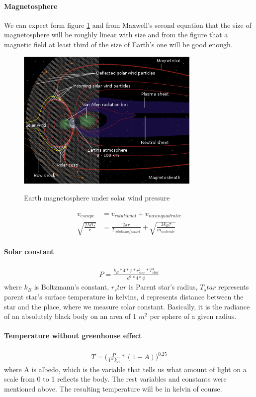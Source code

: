 \documentclass{cfp}
\begin{document}
\paragraph{Magnetosphere} We can expect form figure \ref{mag} and from Maxwell's second equation that the size of magnetosphere will be roughly linear with size and from the figure that a magnetic field at least third of the size of Earth's one will be good enough.
\begin{figure}[!h]
\centering
\caption{Earth magnetosphere under solar wind pressure}
\includegraphics[width=250pt]{mag.png}
\label{mag}
\end{figure}
\begin{align}
v_{escape} &= v_{rotational} + v_{mean quadratic}\\
\sqrt{\frac{2MG}{r}} &= \frac{2 \pi r}{T_{rotation of planet}} + \sqrt{\frac{3 k_B \tau}{m_{molecule}}}
\end{align}
\paragraph{Solar constant}
\begin{align}
P = \frac{k_B*4*\phi*r_{star}^2*T_{star}^4}{d^2*4*\phi}
\end{align}
where $k_B$ is Boltzmann's constant, $r_star$ is Parent star's radius, $T_star$ represents parent star's surface temperature in kelvins, d represents distance between the star and the place, where we measure solar constant. Basically, it is the radiance of an absolutely black body on an area of 1 $m^2$ per sphere of a given radius.
\paragraph{Temperature without greenhouse effect}
\begin{align}
T = \bigg(\frac{P}{4*k_B} * (1-A)\bigg)^{0.25}
\end{align}
where A is albedo, which is the variable that tells us what amount of light on a scale from 0 to 1 reflects the body. The rest variables and constants were mentioned above. 
The resulting temperature will be in kelvin of course.
\end{document}
